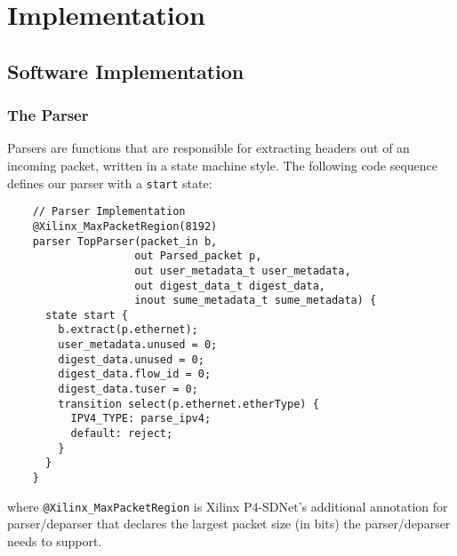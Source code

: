 \chapter{Implementation}
%
%

\section{Software Implementation}
	\subsection{The Parser}
Parsers are functions that are responsible for extracting headers out of an incoming packet, written in a state machine style. The following code sequence defines our parser with a \texttt{start} state:

{\renewcommand{\baselinestretch}{0.8}\small
	\begin{verbatim}
    // Parser Implementation
    @Xilinx_MaxPacketRegion(8192)
    parser TopParser(packet_in b, 
                    out Parsed_packet p, 
                    out user_metadata_t user_metadata,
                    out digest_data_t digest_data,
                    inout sume_metadata_t sume_metadata) {
      state start {
        b.extract(p.ethernet);
        user_metadata.unused = 0;
        digest_data.unused = 0;
        digest_data.flow_id = 0;
        digest_data.tuser = 0;
        transition select(p.ethernet.etherType) {
          IPV4_TYPE: parse_ipv4;
          default: reject;
        } 
      }   
    }
	\end{verbatim}
}
where \texttt{@Xilinx\_MaxPacketRegion} is Xilinx P4-SDNet's additional annotation for parser/deparser that declares the largest packet size (in bits) the parser/deparser needs to support.

